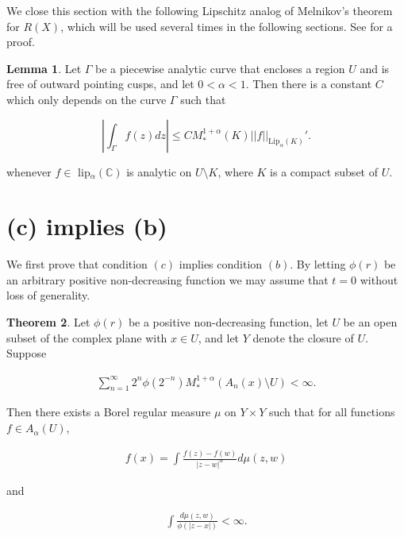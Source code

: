 \documentclass{article}
\theoremstyle{definition}
\newtheorem{theorem}{Theorem}
\newtheorem{lemma}[theorem]{Lemma}
\begin{document}
We close this section with the following Lipschitz analog of Melnikov's theorem \cite[Theorem 4]{Melnikov} for $R(X)$, which will be used several times in the following sections. See \cite[2.6]{Lord1994} for a proof. 

\begin{lemma}
\label{Lord}
     Let $\Gamma$ be a piecewise analytic curve that encloses a region $U$ and is free of outward pointing cusps, and let $0<\alpha<1$. Then there is a constant $C$ which only depends on the curve $\Gamma$ such that

\begin{equation*} 
\left| \int_{\Gamma} f(z) dz\right| \leq C M_*^{1+\alpha}(K) ||f||_{\text{Lip}_\alpha(K)}'.
\end{equation*}

\noindent whenever $f \in $ lip$_\alpha(\mathbb C)$
 is analytic on $U \setminus K$, where $K$ is a compact subset of $U$.

\end{lemma}


\section{(c) implies (b)}

We first prove that condition $(c)$ implies condition $(b)$. By letting $\phi(r)$ be an arbitrary positive non-decreasing function we may assume that $t=0$ without loss of generality.


\begin{theorem}
\label{c then b}
 Let $\phi(r)$ be a positive non-decreasing function, let $U$ be an open subset of the complex plane with $x \in U$, and let $Y$ denote the closure of $U$. Suppose

\begin{align*}
    \sum_{n=1}^{\infty} 2^n \phi(2^{-n}) M^{1+\alpha}_*(A_n(x) \setminus U) < \infty.
\end{align*}


\noindent Then there exists a Borel regular measure $\mu$ on $Y \times Y$ such that for all functions $f \in A_\alpha(U)$,

\begin{align*}
    f(x) = \int \frac{f(z)-f(w)}{|z-w|^{\alpha}} d\mu(z,w)
\end{align*}


\noindent and 

\begin{align*}
    \int \frac{d\mu(z,w)}{\phi(|z-x|)} < \infty.
\end{align*}
    
\end{theorem}
\end{document}
